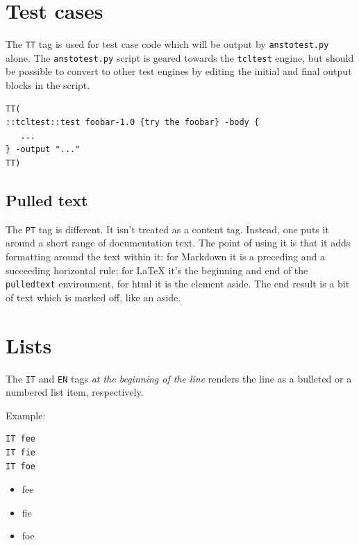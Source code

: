 \documentclass{report}
\begin{document}
\section{Test cases}
\label{test-cases}

The \texttt{TT} tag is used for test case code which will be output by \texttt{anstotest.py} alone. The \texttt{anstotest.py} script is geared towards the \texttt{tcltest} engine, but should be possible to convert to other test engines by editing the initial and final output blocks in the script.

\begin{verbatim}
TT(
::tcltest::test foobar-1.0 {try the foobar} -body {
   ...
} -output "..."
TT)
\end{verbatim}

\begin{pulledtext}

\section{Pulled text}
\label{pulled-text}

The \texttt{PT} tag is different. It isn't treated as a content tag. Instead, one puts it around a short range of documentation text. The point of using it is that it adds formatting around the text within it: for Markdown it is a preceding and a succeeding horizontal rule; for \LaTeX{} it's the beginning and end of the \texttt{pulledtext} environment, for html it is the element aside. The end result is a bit of text which is marked off, like an aside.
\end{pulledtext}

\section{Lists}
\label{lists}

The \texttt{IT} and \texttt{EN} tags \emph{at the beginning of the line} renders the line as a bulleted or a numbered list item, respectively.

Example:

\begin{verbatim}
IT fee
IT fie
IT foe
\end{verbatim}

\begin{itemize}
\item fee
\item fie
\item foe
\end{itemize}
\end{document}

